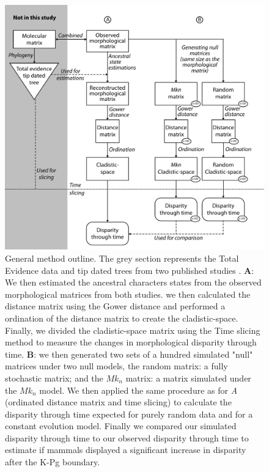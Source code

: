 \documentclass[12pt,letterpaper]{article}
\begin{document}
\begin{figure}[!htbp]
\centering
    \includegraphics[keepaspectratio=true]{Figures/MEthod_outline.pdf}
\caption{General method outline. The grey section represents the Total Evidence data and tip dated trees from two published studies \citep{MEE3:MEE312084,beckancient2014}. \textbf{A}: We then estimated the ancestral characters states from the observed morphological matrices from both studies. we then calculated the distance matrix using the Gower distance \citep{Gower71} and performed a ordination of the distance matrix to create the cladistic-space. Finally, we divided the cladistic-space matrix using the Time slicing method to measure the changes in morphological disparity through time. \textbf{B}: we then generated two sets of a hundred simulated "null" matrices under two null models, the random matrix: a fully stochastic matrix; and the $Mk_n$ matrix: a matrix simulated under the $Mk_n$ model. We then applied the same procedure as for \textit{A} (ordinated distance matrix and time slicing) to calculate the disparity through time expected for purely random data and for a constant evolution model. Finally we compared our simulated disparity through time to our observed disparity through time to estimate if mammals displayed a significant increase in disparity after the K-Pg boundary.}
\label{fig_method}
\end{figure}
\end{document}
